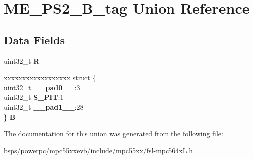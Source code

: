 \hypertarget{unionME__PS2__32B__tag}{}\section{M\+E\+\_\+\+P\+S2\+\_\+B\+\_\+tag Union Reference}
\label{unionME__PS2__32B__tag}
\subsection*{Data Fields}
\begin{DoxyCompactItemize}
\item 
\mbox{\label{unionME__PS2__32B__tag_a4b297d60928a5bec36faf6aa46c6455f}} 
uint32\+\_\+t {\bfseries R}
\item 
\mbox{\label{unionME__PS2__32B__tag_ae0b55ddfe7d10e0b8c621ef35bfb4f05}} 
\begin{tabbing}
xx\=xx\=xx\=xx\=xx\=xx\=xx\=xx\=xx\=\kill
struct \{\\
\>uint32\_t {\bfseries \_\_pad0\_\_}:3\\
\>uint32\_t {\bfseries S\_PIT}:1\\
\>uint32\_t {\bfseries \_\_pad1\_\_}:28\\
\} {\bfseries B}\\

\end{tabbing}\end{DoxyCompactItemize}


The documentation for this union was generated from the following file\+:\begin{DoxyCompactItemize}
\item 
bsps/powerpc/mpc55xxevb/include/mpc55xx/fsl-\/mpc564x\+L.\+h\end{DoxyCompactItemize}
